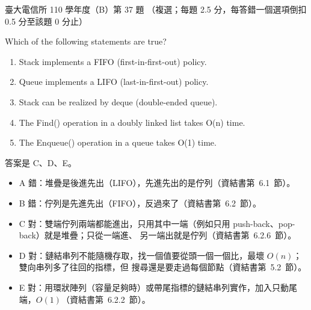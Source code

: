 \begin{pastexam}[label={px:ntu-110-comm-dsa-37}]{臺大電信所 110 學年度（B）第 37 題}
（複選；每題 2.5 分，每答錯一個選項倒扣 0.5 分至該題 0 分止）

Which of the following statements are true?
\begin{enumerate}[label=\Alph*.]
\item Stack implements a FIFO (first-in-first-out) policy.
\item Queue implements a LIFO (last-in-first-out) policy.
\item Stack can be realized by deque (double-ended queue).
\item The Find() operation in a doubly linked list takes O(n) time.
\item The Enqueue() operation in a queue takes O(1) time.
\end{enumerate}
\end{pastexam}

\begin{pastsoln}
答案是 C、D、E。
\begin{itemize}
\item A 錯：堆疊是後進先出（LIFO），先進先出的是佇列（資結書第~6.1~節）。
\item B 錯：佇列是先進先出（FIFO），反過來了（資結書第~6.2~節）。
\item C 對：雙端佇列兩端都能進出，只用其中一端（例如只用 push-back、pop-back）就是堆疊；只從一端進、
另一端出就是佇列（資結書第~6.2.6~節）。
\item D 對：鏈結串列不能隨機存取，找一個值要從頭一個一個比，最壞 $O(n)$；雙向串列多了往回的指標，但
搜尋還是要走過每個節點（資結書第~5.2~節）。
\item E 對：用環狀陣列（容量足夠時）或帶尾指標的鏈結串列實作，加入只動尾端，$O(1)$（資結書第~6.2.2~節）。
\end{itemize}
\end{pastsoln}

